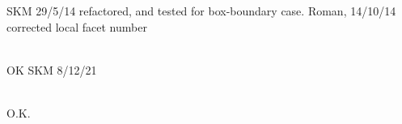 \begin{DoxyRefList}
\label{test__test000027}%
%
SKM 29/5/14 refactored, and tested for box-\/boundary case. Roman, 14/10/14 corrected local facet number  
\item[Member \doxylink{namespacecsmp_a7fafb9eb504a7da6b008f83f749d8173}{csmp\+::node\+Neighbors} (const \doxylink{classcsmp_1_1_region}{Region$<$ dim $>$} \&subdomain, vector\texorpdfstring{$<$}{<} set$<$ size\+\_\+t $>$ \texorpdfstring{$>$}{>} \&node\+\_\+neighbors, bool verbose)]\hfill \\
\label{test__test000049}%
%
OK SKM 8/12/21  
\item[Member \doxylink{classcsmp_1_1_num_integral___set_r_h_s__to___zero_aa5af4afd7b135068cd91b2f3c7fa4701}{csmp\+::Num\+Integral\+\_\+\+Set\+RHS\+\_\+to\+\_\+\+Zero\texorpdfstring{$<$}{<} dim, CELL \texorpdfstring{$>$}{>}\+::Compute\+Contribution} (const CELL$<$ dim $>$ \&) override final]\hfill \\
\label{test__test000028}%
%
O.\+K. ~\newline
  

\end{DoxyRefList}
